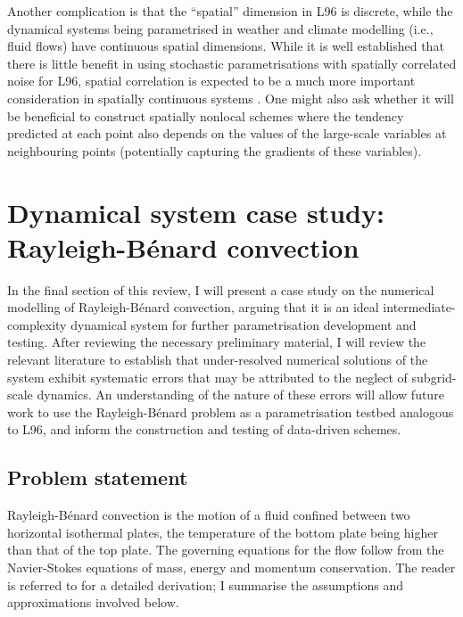 \documentclass[titlepage,twoside]{article}
\numberwithin{equation}{section}
\newcommand{\rb}{Rayleigh-B\'{e}nard}
\begin{document}
Another complication is that the ``spatial'' dimension in L96 is
discrete, while the dynamical systems being parametrised in weather and
climate modelling (i.e., fluid flows) have continuous spatial
dimensions. While it is well established that there is little benefit in
using stochastic parametrisations with spatially correlated noise for
L96, spatial correlation is expected to be a much more important
consideration in spatially continuous systems \parencite{arnold2013}.
One might also ask whether it will be beneficial to construct spatially
nonlocal schemes where the tendency predicted at each point also depends on the
values of the large-scale variables at neighbouring points (potentially
capturing the gradients of these variables).


\clearpage
\section{Dynamical system case study: \rb{} convection}
In the final section of this review, I will present a case study on the
numerical modelling of \rb{} convection, arguing that it is an ideal
intermediate-complexity dynamical system for further parametrisation
development and testing. After reviewing the necessary preliminary material, I
will review the relevant literature to establish that under-resolved numerical
solutions of the system exhibit systematic errors that may be attributed to the
neglect of subgrid-scale dynamics. An understanding of the nature of these
errors will allow future work to use the \rb{} problem as a parametrisation
testbed analogous to L96, and inform the construction and testing of
data-driven schemes.


\subsection{Problem statement}
\rb{} convection is the motion of a fluid confined between two
horizontal isothermal plates, the temperature of the bottom plate being
higher than that of the top plate. The governing equations for the flow
follow from the Navier-Stokes equations of mass, energy and momentum
conservation. The reader is referred to \textcite{chandrasekhar1961} for
a detailed derivation; I summarise the assumptions and approximations
involved below.
\end{document}
